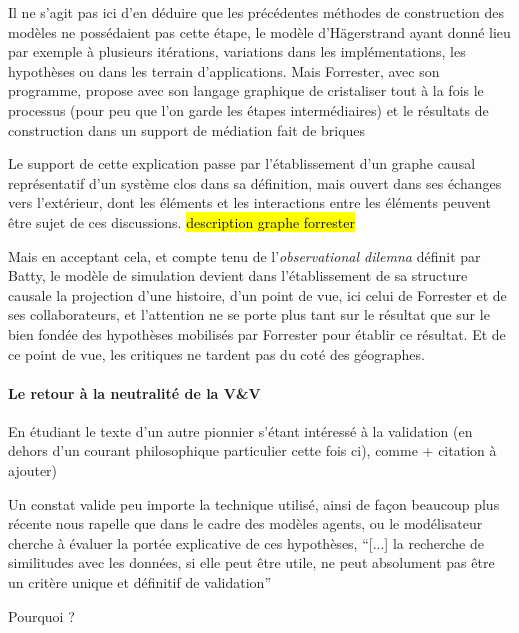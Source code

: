 Il ne s'agit pas ici d'en déduire que les précédentes méthodes de construction des modèles ne possédaient pas cette étape, le modèle d'Hägerstrand ayant donné lieu par exemple à plusieurs itérations, variations dans les implémentations, les hypothèses ou dans les terrain d'applications. Mais Forrester, avec son programme, propose avec son langage graphique de cristaliser tout à la fois le processus (pour peu que l'on garde les étapes intermédiaires) et le résultats de construction dans un support de médiation fait de briques 

Le support de cette explication passe par l'établissement d'un graphe causal représentatif d'un système clos dans sa définition, mais ouvert dans ses échanges vers l'extérieur, dont les éléments et les interactions entre les éléments peuvent être sujet de ces discussions. \hl{description graphe forrester}

Mais en acceptant cela, et compte tenu de l'\textit{observational dilemna} définit par Batty, le modèle de simulation devient dans l'établissement de sa structure causale la projection d'une histoire, d'un point de vue, ici celui de Forrester et de ses collaborateurs, et l'attention ne se porte plus tant sur le résultat que sur le bien fondée des hypothèses mobilisés par Forrester pour établir ce résultat. Et de ce point de vue, les critiques ne tardent pas du coté des géographes.

\paragraph{Le retour à la neutralité de la V\&V}

En étudiant le texte d'un autre pionnier s'étant intéressé à la validation (en dehors d'un courant philosophique particulier cette fois ci), comme \autocite{Hermann1967} + citation à ajouter)


Un constat valide peu importe la technique utilisé, ainsi de façon beaucoup plus récente \textcite[106]{Amblard2006} nous rapelle que dans le cadre des modèles agents, ou le modélisateur cherche à évaluer la portée explicative de ces hypothèses, \enquote{[...] la recherche de similitudes avec les données, si elle peut être utile, ne peut absolument pas être un critère unique et définitif de validation}


Pourquoi ? 



